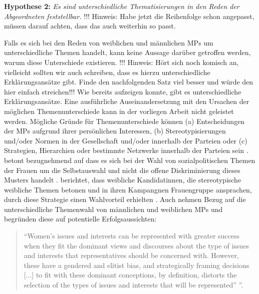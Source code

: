 \documentclass[12pt, 
    twoside=false, 
    bibliography=totoc, 
    numbers=endperiod, 
    headings=normal, 
    toc=chapterentrydotfill
    ]{scrbook}
\begin{document}
\textbf{Hypothese 2:} \emph{Es sind unterschiedliche Thematisierungen in den Reden der Abgeordneten feststellbar.}  !!! Hinweis: Habe jetzt die Reihenfolge schon angepasst, müssen darauf achten, dass das auch weiterhin so passt.

Falls es sich bei den Reden von weiblichen und männlichen MPs um unterschiedliche Themen handelt, kann keine Aussage darüber getroffen werden, warum diese Unterschiede existieren. !!! Hinweis: Hört sich noch komisch an, vielleicht sollten wir auch schreiben, dass es hierzu unterschiedliche Erklärungsansätze gibt. Finde den nachfolgenden Satz viel besser und würde den hier einfach streichen!!!
Wie \textcite{back_2014} bereits aufzeigen konnte, gibt es unterschiedliche Erklärungsansätze. Eine ausführliche Auseinandersetzung mit den Ursachen der möglichen Themenunterschiede kann in der vorliegen Arbeit nicht geleistet werden. Mögliche Gründe für Themenunterschiede können (a) Entscheidungen der MPs aufgrund ihrer persönlichen Interessen, (b) Stereotypisierungen und/oder Normen in der Gesellschaft und/oder innerhalb der Parteien oder (c) Strategien, Hierarchien oder bestimmte Netzwerke innerhalb der Parteien sein \parencites[507]{back_2014}. \textcite [250]{ennser-jedenastik_2017} betont bezugnehmend auf \textcites{baekgaard_2012}{thomas_1994} dass es sich bei der Wahl von sozialpolitischen Themen der Frauen um die Selbstauswahl und nicht die offene Diskriminierung dieses Musters handelt \parencite[250]{ennser-jedenastik_2017}. \textcite{herrnson_2003} berichtet, dass weibliche Kandidatinnen, die stereotypische weibliche Themen betonen und in ihren Kampangnen Frauengruppe ansprachen, durch diese Strategie einen Wahlvorteil erhielten \parencite[250]{ennser-jedenastik_2017}. Auch \textcite{celis_2018} nehmen Bezug auf die unterschiedliche Themenwahl von männlichen und weiblichen MPs und begründen diese auf potentielle Erfolgsaussichten:

\begin{quote}
    \enquote{Women’s issues and interests can be represented with greater success when they fit the dominant views and discourses about the type of issues and interests that representatives should be concerned with. However, these have a gendered and elitist bias, and strategically framing decisions [...] to fit with these dominant conceptions, by definition, distorts the selection of the types of issues and interests that will be represented” \parencite[151]{celis_2018}}.
\end{quote}
\end{document}
